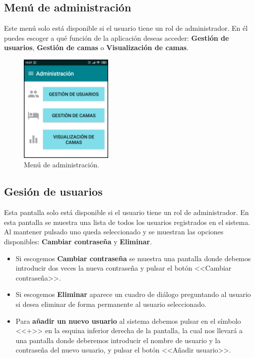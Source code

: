 \subsection{Menú de administración}

Este menú solo está disponible si el usuario tiene un rol de administrador. En él puedes escoger a qué función de la aplicación deseas acceder: \textbf{Gestión de usuarios}, \textbf{Gestión de camas} o \textbf{Visualización de camas}. 

\begin{figure}[H]
	\centering
	\includegraphics[width=0.4\textwidth]{../img/menudeadministracion.png}
	\caption{Menú de administración.}
	\label{fig:menudeadministracion}
\end{figure}

\subsection{Gesión de usuarios}

Esta pantalla solo está disponible si el usuario tiene un rol de administrador. En esta pantalla se muestra una lista de todos los usuarios registrados en el sistema. Al mantener pulsado uno queda seleccionado y se muestran las opciones disponibles: \textbf{Cambiar contraseña} y \textbf{Eliminar}.

\begin{itemize}
	\item Si escogemos \textbf{Cambiar contraseña} se muestra una pantalla donde debemos introducir dos veces la nueva contraseña y pulsar el botón <<Cambiar contraseña>>.
	\item Si escogemos \textbf{Eliminar} aparece un cuadro de diálogo preguntando al usuario si desea eliminar de forma permanente al usuario seleccionado. 
	\item Para \textbf{añadir un nuevo usuario} al sistema debemos pulsar en el símbolo <<+>> en la esquina inferior derecha de la pantalla, la cual nos llevará a una pantalla donde deberemos introducir el nombre de usuario y la contraseña del nuevo usuario, y pulsar el botón <<Añadir usuario>>. 
\end{itemize}  


